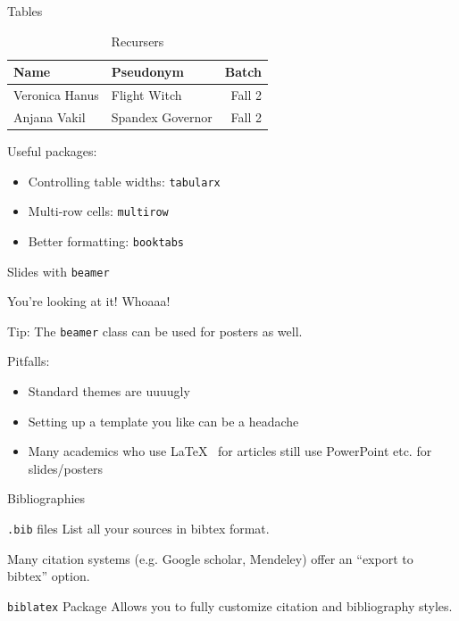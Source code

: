 \documentclass[xcolor={dvipsnames}]{beamer}
\begin{document}
\begin{frame}{Tables}

\begin{table}
	\caption{Recursers}
	\begin{tabular}{llr}
		\toprule
		Name 					& Pseudonym 				& Batch	\\
		\midrule
		Veronica Hanus 	& Flight Witch 				& Fall 2	\\
		Anjana Vakil 		& Spandex Governor 	& Fall 2	\\
		\bottomrule
	\end{tabular}
\end{table}

\begin{block}{Useful packages:}
\begin{itemize}
\item Controlling table widths: \texttt{tabularx}
\item Multi-row cells: \texttt{multirow}
\item Better formatting: \texttt{booktabs} 
\end{itemize}
\end{block}

\end{frame}

\begin{frame}{Slides with \texttt{beamer}}

 You're looking at it! Whoaaa!

\pause

\vfill

\begin{block}{Tip:}
The \texttt{beamer} class can be used for posters as well.
\end{block}

\pause

\vfill

Pitfalls:
\begin{itemize}[<+->]
\item Standard themes are uuuugly
\item Setting up a template you like can be a headache
\item Many academics who use \LaTeX~ for articles still use PowerPoint etc. for slides/posters
\end{itemize}
\end{frame}

\begin{frame}{Bibliographies}
\begin{block}{\texttt{.bib} files}
List all your sources in bibtex format.

Many citation systems (e.g. Google scholar, Mendeley) offer an ``export to bibtex'' option.
\end{block}
\begin{block}{\texttt{biblatex} Package}
Allows you to fully customize citation and bibliography styles.
\end{block}
\end{frame}
\end{document}

